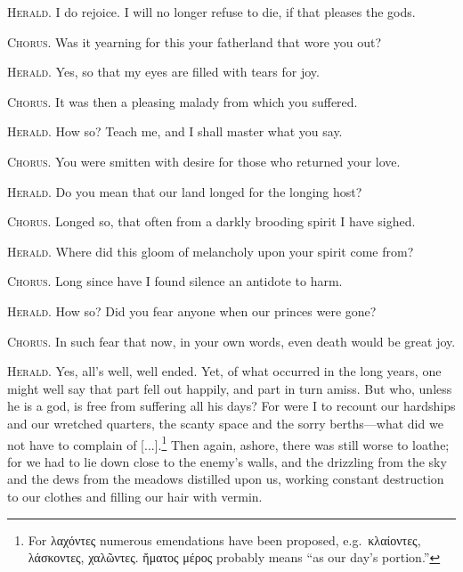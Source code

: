 \documentclass[12pt]{article}
\begin{document}
\textsc{Herald.} I do rejoice. I will no longer refuse to die, if that pleases the gods.

\textsc{Chorus.} Was it yearning for this your fatherland that wore you out?

\textsc{Herald.} Yes, so that my eyes are filled with tears for joy.

\textsc{Chorus.} It was then a pleasing malady from which you suffered.

\textsc{Herald.} How so? Teach me, and I shall master what you say.

\textsc{Chorus.} You were smitten with desire for those who returned your love.

\textsc{Herald.} Do you mean that our land longed for the longing host?

\textsc{Chorus.} Longed so, that often from a darkly brooding spirit I have sighed.

\textsc{Herald.} Where did this gloom of melancholy upon your spirit come from?

\textsc{Chorus.} Long since have I found silence an antidote to harm.

\textsc{Herald.} How so? Did you fear anyone when our princes were gone?

\textsc{Chorus.} In such fear that now, in your own words, even death would be great joy.

\textsc{Herald.} Yes, all's well, well ended. Yet, of what occurred in the long years, one might well say that part fell out happily, and part in turn amiss. But who, unless he is a god, is free from suffering all his days? For were I to recount our hardships and our wretched quarters, the scanty space and the sorry berths---what did we not have to complain of [...].\footnote{For λαχόντες numerous emendations have been proposed, e.g.~κλαίοντες, λάσκοντες, χαλῶντες. ἤματος μέρος probably means ``as our day's portion.''} Then again, ashore, there was still worse to loathe; for we had to lie down close to the enemy's walls, and the drizzling from the sky and the dews from the meadows distilled upon us, working constant destruction to our clothes and filling our hair with vermin.
\end{document}
